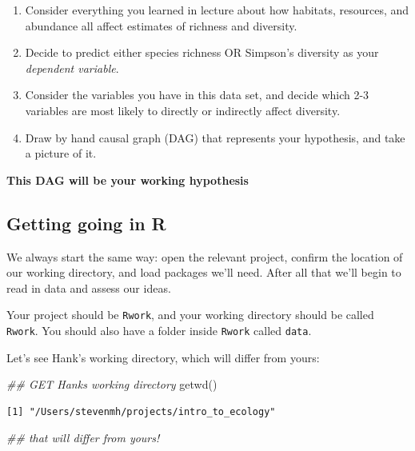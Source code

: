 \documentclass[
  letterpaper,
  DIV=11,
  numbers=noendperiod]{scrreprt}
\newenvironment{Shaded}{\begin{snugshade}}{\end{snugshade}}
\newcommand{\DocumentationTok}[1]{\textcolor[rgb]{0.37,0.37,0.37}{\textit{#1}}}
\newcommand{\FunctionTok}[1]{\textcolor[rgb]{0.28,0.35,0.67}{#1}}
\newcommand{\NormalTok}[1]{\textcolor[rgb]{0.00,0.23,0.31}{#1}}
\providecommand{\tightlist}{%
  \setlength{\itemsep}{0pt}\setlength{\parskip}{0pt}}
\begin{document}
\begin{enumerate}
\def\labelenumi{\arabic{enumi}.}
\tightlist
\item
  Consider everything you learned in lecture about how habitats,
  resources, and abundance all affect estimates of richness and
  diversity.
\item
  Decide to predict either species richness OR Simpson's diversity as
  your \emph{dependent variable}.
\item
  Consider the variables you have in this data set, and decide which 2-3
  variables are most likely to directly or indirectly affect diversity.
\item
  Draw by hand causal graph (DAG) that represents your hypothesis, and
  take a picture of it.
\end{enumerate}

\textbf{This DAG will be your working hypothesis}

\subsection{Getting going in R}\label{getting-going-in-r}

We always start the same way: open the relevant project, confirm the
location of our working directory, and load packages we'll need. After
all that we'll begin to read in data and assess our ideas.

Your project should be \texttt{Rwork}, and your working directory should
be called \texttt{Rwork}. You should also have a folder inside
\texttt{Rwork} called \texttt{data}.

Let's see Hank's working directory, which will differ from yours:

\begin{Shaded}
\begin{Highlighting}[]
\DocumentationTok{\#\# GET Hank\textquotesingle{}s working directory}
\FunctionTok{getwd}\NormalTok{()}
\end{Highlighting}
\end{Shaded}

\begin{verbatim}
[1] "/Users/stevenmh/projects/intro_to_ecology"
\end{verbatim}

\begin{Shaded}
\begin{Highlighting}[]
\DocumentationTok{\#\# that will differ from yours!}
\end{Highlighting}
\end{Shaded}
\end{document}
